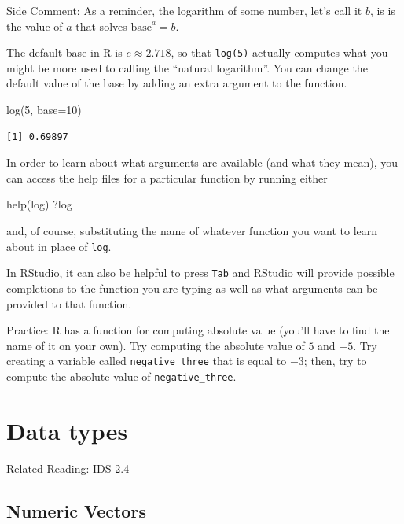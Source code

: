 \documentclass[
  letterpaper,
  DIV=11,
  numbers=noendperiod]{scrreprt}
\newenvironment{Shaded}{\begin{snugshade}}{\end{snugshade}}
\newcommand{\AttributeTok}[1]{\textcolor[rgb]{0.40,0.45,0.13}{#1}}
\newcommand{\DecValTok}[1]{\textcolor[rgb]{0.68,0.00,0.00}{#1}}
\newcommand{\FunctionTok}[1]{\textcolor[rgb]{0.28,0.35,0.67}{#1}}
\newcommand{\NormalTok}[1]{\textcolor[rgb]{0.00,0.23,0.31}{#1}}
\begin{document}
{Side Comment:} As a reminder, the logarithm of some number, let's call
it \(b\), is is the value of \(a\) that solves \(\textrm{base}^a = b\).

The default base in R is \(e \approx 2.718\), so that \texttt{log(5)}
actually computes what you might be more used to calling the ``natural
logarithm''. You can change the default value of the base by adding an
extra argument to the function.

\begin{Shaded}
\begin{Highlighting}[]
\FunctionTok{log}\NormalTok{(}\DecValTok{5}\NormalTok{, }\AttributeTok{base=}\DecValTok{10}\NormalTok{)}
\end{Highlighting}
\end{Shaded}

\begin{verbatim}
[1] 0.69897
\end{verbatim}

In order to learn about what arguments are available (and what they
mean), you can access the help files for a particular function by
running either

\begin{Shaded}
\begin{Highlighting}[]
\FunctionTok{help}\NormalTok{(log)}
\NormalTok{?log}
\end{Highlighting}
\end{Shaded}

and, of course, substituting the name of whatever function you want to
learn about in place of \texttt{log}.

In RStudio, it can also be helpful to press \texttt{Tab} and RStudio
will provide possible completions to the function you are typing as well
as what arguments can be provided to that function.

{Practice:} R has a function for computing absolute value (you'll have
to find the name of it on your own). Try computing the absolute value of
\(5\) and \(-5\). Try creating a variable called
\texttt{negative\_three} that is equal to \(-3\); then, try to compute
the absolute value of \texttt{negative\_three}.

\section{Data types}\label{data-types}

Related Reading: IDS 2.4

\subsection{Numeric Vectors}\label{numeric-vectors}
\end{document}
